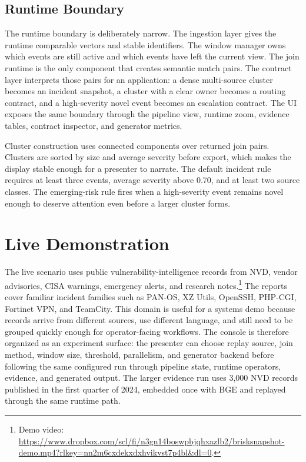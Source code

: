 \documentclass[sigconf]{acmart}
\begin{document}
\subsection{Runtime Boundary}

The runtime boundary is deliberately narrow. The ingestion layer gives the runtime comparable vectors and stable identifiers. The window manager owns which events are still active and which events have left the current view. The join runtime is the only component that creates semantic match pairs. The contract layer interprets those pairs for an application: a dense multi-source cluster becomes an incident snapshot, a cluster with a clear owner becomes a routing contract, and a high-severity novel event becomes an escalation contract. The UI exposes the same boundary through the pipeline view, runtime zoom, evidence tables, contract inspector, and generator metrics.

Cluster construction uses connected components over returned join pairs. Clusters are sorted by size and average severity before export, which makes the display stable enough for a presenter to narrate. The default incident rule requires at least three events, average severity above 0.70, and at least two source classes. The emerging-risk rule fires when a high-severity event remains novel enough to deserve attention even before a larger cluster forms.

\section{Live Demonstration}

The live scenario uses public vulnerability-intelligence records from NVD, vendor advisories, CISA warnings, emergency alerts, and research notes.\footnote{Demo video: \url{https://www.dropbox.com/scl/fi/n3gn14boswpbjqhxazlb2/brisksnapshot-demo.mp4?rlkey=nn2m6cxdekxdxhvikvst7p4bl&dl=0}.} The reports cover familiar incident families such as PAN-OS, XZ Utils, OpenSSH, PHP-CGI, Fortinet VPN, and TeamCity. This domain is useful for a systems demo because records arrive from different sources, use different language, and still need to be grouped quickly enough for operator-facing workflows. The console is therefore organized as an experiment surface: the presenter can choose replay source, join method, window size, threshold, parallelism, and generator backend before following the same configured run through pipeline state, runtime operators, evidence, and generated output. The larger evidence run uses 3,000 NVD records published in the first quarter of 2024, embedded once with BGE and replayed through the same runtime path.
\end{document}
